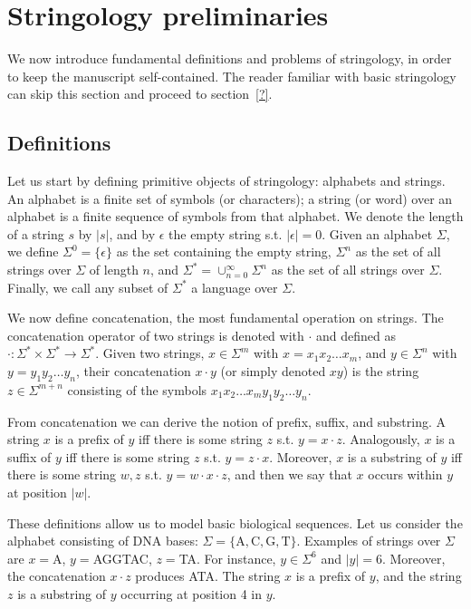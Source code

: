 
\chapter{Stringology preliminaries}

We now introduce fundamental definitions and problems of stringology, in order to keep the manuscript self-contained.
The reader familiar with basic stringology can skip this section and proceed to section~\ref{?}.

\section{Definitions}

Let us start by defining primitive objects of stringology: alphabets and strings.
An alphabet is a finite set of symbols (or characters); a string (or word) over an alphabet is a finite sequence of symbols from that alphabet.
We denote the length of a string $s$ by $|s|$, and by $\epsilon$ the empty string s.t. $|\epsilon|=0$.
Given an alphabet $\Sigma$, we define $\Sigma^0=\{ \epsilon \}$ as the set containing the empty string, $\Sigma^n$ as the set of all strings over $\Sigma$ of length $n$, and $\Sigma^* = \cup_{n=0}^{\infty}{\Sigma^n}$ as the set of all strings over $\Sigma$.
Finally, we call any subset of $\Sigma^*$ a language over $\Sigma$.

We now define concatenation, the most fundamental operation on strings.
The concatenation operator of two strings is denoted with $\cdot$ and defined as $\cdot : \Sigma^* \times \Sigma^* \rightarrow \Sigma^*$.
Given two strings, $x \in \Sigma^m$ with $x=x_1 x_2 \dots x_m$, and $y \in \Sigma^n$ with $y=y_1 y_2 \dots y_n$, their concatenation $x \cdot y$ (or simply denoted $xy$) is the string $z \in \Sigma^{m+n}$ consisting of the symbols $x_1 x_2 \dots x_m y_1 y_2 \dots y_n$.

From concatenation we can derive the notion of prefix, suffix, and substring.
A string $x$ is a prefix of $y$ iff there is some string $z$ s.t. $y=x\cdot z$.
Analogously, $x$ is a suffix of $y$ iff there is some string $z$ s.t. $y=z\cdot x$.
Moreover, $x$ is a substring of $y$ iff there is some string $w,z$ s.t. $y=w\cdot x \cdot z$, and then we say that $x$ occurs within $y$ at position $|w|$.

\begin{example}
These definitions allow us to model basic biological sequences.
Let us consider the alphabet consisting of DNA bases: $\Sigma = \{\text{A},\text{C},\text{G},\text{T}\}$.
Examples of strings over $\Sigma$ are $x=$A, $y=$AGGTAC, $z=$TA.
For instance, $y \in \Sigma^6$ and $| y | = 6$.
Moreover, the concatenation $x \cdot z$ produces ATA.
The string $x$ is a prefix of $y$, and the string $z$ is a substring of $y$  occurring at position 4 in $y$.
\end{example}

